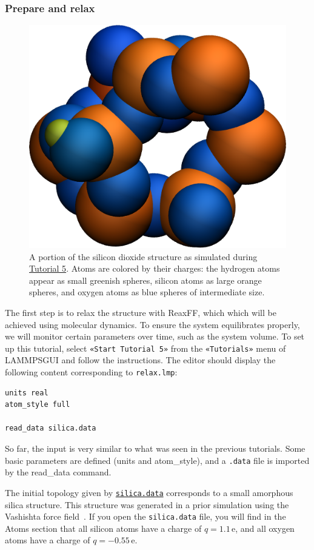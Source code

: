 \documentclass[9pt,tutorial]{livecoms}
\newcommand{\lmpcmd}[1]{\colorbox{listing}{\textcolor{command}{\small{#1}}}} %
\newcommand{\flecmd}[1]{\textcolor{command}{\texttt{#1}}} %
\newcommand{\guicmd}[1]{\textcolor{command}{\texttt{«#1»}}} %
\newcommand{\dwlcmd}[1]{\textcolor{download}{\texttt{#1}}} %
\newcommand{\lammpsgui}{\textsf{LAMMPS\textendash GUI}}
\newcommand{\filepath}{https://raw.githubusercontent.com/lammpstutorials/lammpstutorials-article/main/files/}
\begin{document}
\subsubsection{Prepare and relax}

\begin{figure}
\centering
\includegraphics[width=0.55\linewidth]{SIO}
\caption{A portion of the silicon dioxide structure as simulated during
\hyperref[reactive-silicon-dioxide-label]{Tutorial 5}.  Atoms are colored
by their charges: the hydrogen atoms appear as small greenish spheres, silicon
atoms as large orange spheres, and oxygen atoms as blue spheres of intermediate
size.}
\label{fig:SIO}
\end{figure}

The first step is to relax the structure with ReaxFF, which which will be achieved using
molecular dynamics.  To ensure the system equilibrates properly, we will monitor certain
parameters over time, such as the system volume.  To set up this
tutorial, select \guicmd{Start Tutorial 5} from the
\guicmd{Tutorials} menu of \lammpsgui{} and follow the instructions.
The editor should display the following content corresponding to \flecmd{relax.lmp}:
\begin{lstlisting}
units real
atom_style full

read_data silica.data

\end{lstlisting}
So far, the input is very similar to what was seen in the previous tutorials.
Some basic parameters are defined (\lmpcmd{units} and \lmpcmd{atom\_style}),
and a \flecmd{.data} file is imported by the \lmpcmd{read\_data} command.

The initial topology given by \href{\filepath tutorial5/silica.data}{\dwlcmd{silica.data}}
corresponds to a small amorphous silica structure.
This structure was generated in a prior
simulation using the Vashishta force field~\cite{vashishta1990interaction}.
If you open the \flecmd{silica.data} file, you will find in the \lmpcmd{Atoms}
section that all silicon atoms have a charge of $q = 1.1\,\text{e}$, and all oxygen
atoms have a charge of $q = -0.55\,\text{e}$.
\end{document}
